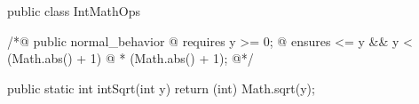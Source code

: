 public class IntMathOps { 

  /*@ public normal_behavior 
    @ requires y >= 0; 
    @ ensures \result * \result <= y && y < (Math.abs(\result) + 1)
    @ * (Math.abs(\result) + 1); 
    @*/ 

  public static int intSqrt(int y) 
  { 
    return (int) Math.sqrt(y); 
  } 
} 
